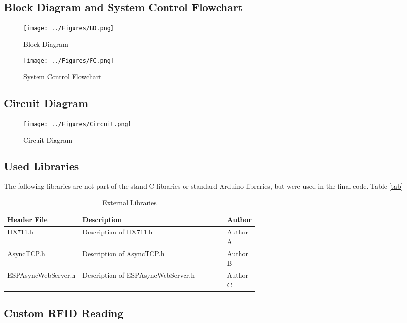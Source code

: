 \documentclass[class=report,11pt,crop=false]{standalone}
\begin{document}
\subsection*{Block Diagram and System Control Flowchart}

\begin{figure}[htbp]
    \centering
    \texttt{[image: ../Figures/BD.png]}
    \caption{Block Diagram}
    \label{fig:BD}
\end{figure}

\begin{figure}[htbp]
    \centering
    \texttt{[image: ../Figures/FC.png]}
    \caption{System Control Flowchart}
    \label{fig:FC}
\end{figure}

\subsection*{Circuit Diagram}

\begin{figure}[htbp]
    \centering
    \texttt{[image: ../Figures/Circuit.png]}
    \caption{Circuit Diagram}
    \label{fig:CD}
\end{figure}

\subsection*{Used Libraries}
The following libraries are not part of the stand C libraries or standard Arduino libraries, but were used in the final code. Table \ref{tab}

\begin{table}[htbp]
    \centering
    {\begin{tabular}{|l|p{0.6\linewidth}|l|}
        \hline
        \textbf{Header File} & \textbf{Description} & \textbf{Author} \\
        \hline
        HX711.h & Description of HX711.h & Author A \\
        AsyncTCP.h & Description of AsyncTCP.h & Author B \\
        ESPAsyncWebServer.h & Description of ESPAsyncWebServer.h & Author C \\
        \hline
    \end{tabular}}
    \caption{External Libraries}
    \label{tab:extL}
\end{table}

\subsection*{Custom RFID Reading}
\end{document}
